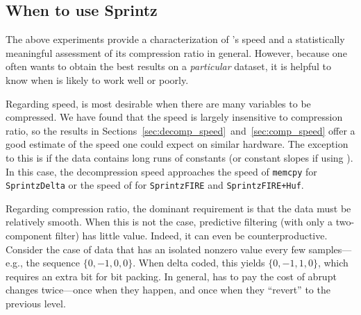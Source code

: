 \subsection{When to use Sprintz}


The above experiments provide a characterization of \mine's speed and a statistically meaningful assessment of its compression ratio in general. However, because one often wants to obtain the best results on a \textit{particular} dataset, it is helpful to know when \minesp is likely to work well or poorly.

Regarding speed, \minesp is most desirable when there are many variables to be compressed. We have found that the speed is largely insensitive to compression ratio, so the results in Sections~\ref{sec:decomp_speed}~and~\ref{sec:comp_speed} offer a good estimate of the speed one could expect on similar hardware. The exception to this is if the data contains long runs of constants (or constant slopes if using \fire). In this case, the decompression speed approaches the speed of \texttt{memcpy} for \texttt{SprintzDelta} or the speed of \fire for \texttt{SprintzFIRE} and \texttt{SprintzFIRE+Huf}.


Regarding compression ratio, the dominant requirement is that the data must be relatively smooth. When this is not the case, predictive filtering (with only a two-component filter) has little value. Indeed, it can even be counterproductive. Consider the case of data that has an isolated nonzero value every few samples---e.g., the sequence $\{0, -1, 0, 0\}$. When delta coded, this yields $\{0, -1, 1, 0\}$, which requires an extra bit for \minesp bit packing. In general, \minesp has to pay the cost of abrupt changes twice---once when they happen, and once when they ``revert'' to the previous level.

